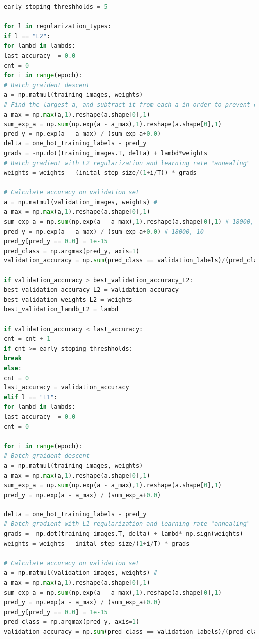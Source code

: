 \documentclass{article} %
\begin{document}
{\begin{lstlisting}[language=Python]
early_stoping_threshholds = 5

for l in regularization_types:
if l == "L2":
for lambd in lambds:
last_accuracy  = 0.0
cnt = 0
for i in range(epoch):
# Batch graident descent
a = np.matmul(training_images, weights) 
# Find the largest a, and subtract it from each a in order to prevent overflow
a_max = np.max(a,1).reshape(a.shape[0],1)
sum_exp_a = np.sum(np.exp(a - a_max),1).reshape(a.shape[0],1) 
pred_y = np.exp(a - a_max) / (sum_exp_a+0.0) 
delta = one_hot_training_labels - pred_y 
grads = -np.dot(training_images.T, delta) + lambd*weights
# Batch gradient with L2 regularization and learning rate "annealing"
weights = weights - (inital_step_size/(1+i/T)) * grads

# Calculate accuracy on validation set
a = np.matmul(validation_images, weights) #
a_max = np.max(a,1).reshape(a.shape[0],1)
sum_exp_a = np.sum(np.exp(a - a_max),1).reshape(a.shape[0],1) # 18000, 1
pred_y = np.exp(a - a_max) / (sum_exp_a+0.0) # 18000, 10
pred_y[pred_y == 0.0] = 1e-15       
pred_class = np.argmax(pred_y, axis=1)
validation_accuracy = np.sum(pred_class == validation_labels)/(pred_class.shape[0]+0.0)

if validation_accuracy > best_validation_accuracy_L2:
best_validation_accuracy_L2 = validation_accuracy
best_validation_weights_L2 = weights
best_validation_lamdb_L2 = lambd

if validation_accuracy < last_accuracy:
cnt = cnt + 1
if cnt >= early_stoping_threshholds:
break
else:
cnt = 0
last_accuracy = validation_accuracy
elif l == "L1":
for lambd in lambds:
last_accuracy  = 0.0
cnt = 0

for i in range(epoch):
# Batch graident descent
a = np.matmul(training_images, weights)
a_max = np.max(a,1).reshape(a.shape[0],1)
sum_exp_a = np.sum(np.exp(a - a_max),1).reshape(a.shape[0],1)  
pred_y = np.exp(a - a_max) / (sum_exp_a+0.0) 

delta = one_hot_training_labels - pred_y 
# Batch gradient with L1 regularization and learning rate "annealing"
grads = -np.dot(training_images.T, delta) + lambd* np.sign(weights)
weights = weights - inital_step_size/(1+i/T) * grads

# Calculate accuracy on validation set
a = np.matmul(validation_images, weights) #
a_max = np.max(a,1).reshape(a.shape[0],1)
sum_exp_a = np.sum(np.exp(a - a_max),1).reshape(a.shape[0],1)
pred_y = np.exp(a - a_max) / (sum_exp_a+0.0) 
pred_y[pred_y == 0.0] = 1e-15       
pred_class = np.argmax(pred_y, axis=1)
validation_accuracy = np.sum(pred_class == validation_labels)/(pred_class.shape[0]+0.0)


\end{lstlisting}}
\end{document}
